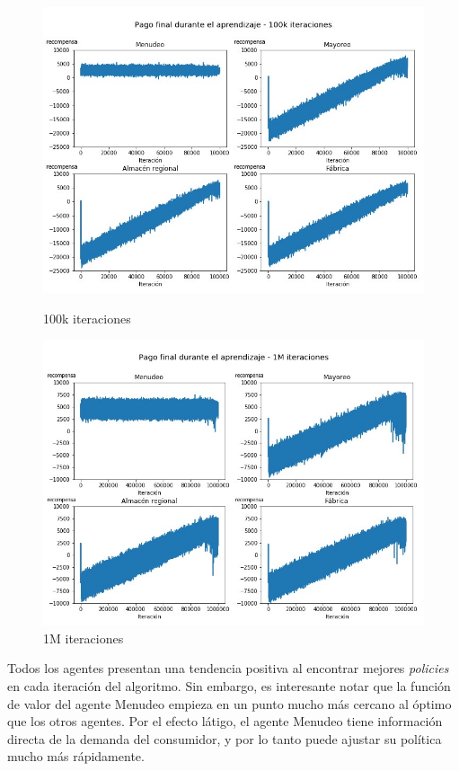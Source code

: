 \begin{figure}[!htb]
   \begin{minipage}{0.48\textwidth}
     \centering
     \includegraphics[width=0.9\linewidth]{tesis_tex/figs/policyiteration_payouts_100000.png}
     \caption{100k iteraciones}\label{politer_payouts_100000}
   \end{minipage}\hfill
   \begin{minipage}{0.48\textwidth}
     \centering
     \includegraphics[width=0.9\linewidth]{tesis_tex/figs/policyiteration_payouts_1000000.png}
     \caption{1M iteraciones}\label{politer_payouts_1000000}
   \end{minipage}
\end{figure}

Todos los agentes presentan una tendencia positiva al encontrar mejores \textit{policies} en cada iteraci\'on del algoritmo. Sin embargo, es interesante notar que la funci\'on de valor del agente Menudeo empieza en un punto mucho m\'as cercano al \'optimo que los otros agentes. Por el efecto l\'atigo, el agente Menudeo tiene informaci\'on directa de la demanda del consumidor, y por lo tanto puede ajustar su pol\'itica mucho m\'as r\'apidamente.\\

